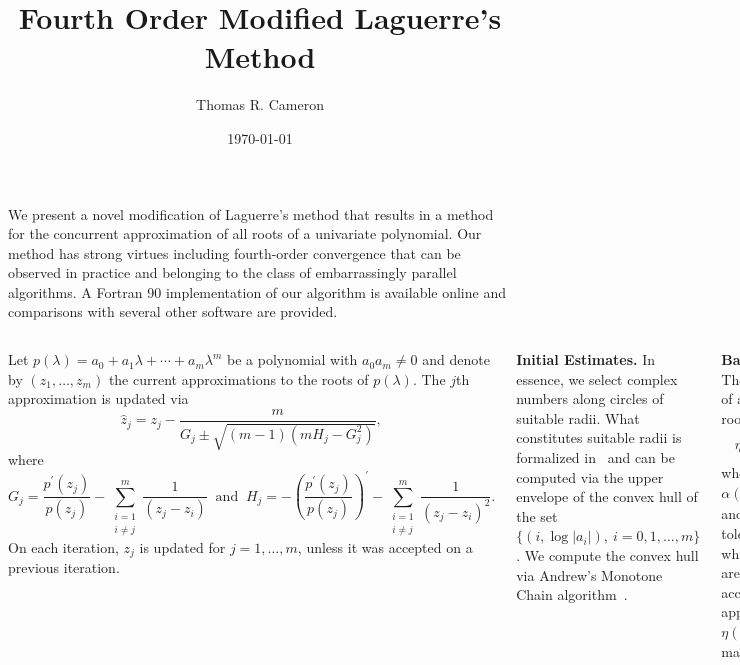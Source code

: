 \documentclass[20 pt, a0paper, portrait]{tikzposter}
\title{Fourth Order Modified Laguerre's Method}
\author{Thomas R. Cameron}
\date{\today}
\institute{Mathematics and Computer Science Department, Davidson College}
\begin{document}
 
\maketitle

{
We present a novel modification of Laguerre's method that results in a method for the concurrent approximation of all roots of a univariate polynomial. Our method has strong virtues including fourth-order convergence that can be observed in practice and belonging to the class of embarrassingly parallel algorithms. A Fortran 90 implementation of our algorithm is available online and comparisons with several other software are provided. 
}

\begin{columns}
	{
		Let $p(\lambda)=a_{0}+a_{1}\lambda+\cdots+a_{m}\lambda^{m}$ be a polynomial with $a_{0}a_{m}\neq 0$ and denote by $(z_{1},\ldots,z_{m})$ the current approximations to the roots of $p(\lambda)$. The $j$th approximation is updated via
		\begin{equation}
		\hat{z}_{j}=z_{j}-\frac{m}{G_{j}\pm\sqrt{(m-1)(mH_{j}-G_{j}^{2})}},
		\end{equation}
		where 
		\begin{equation}
		G_{j}=\frac{p^{'}(z_{j})}{p(z_{j})}-\sum_{\substack{i=1\\i\neq j}}^{m}\frac{1}{(z_{j}-z_{i})}~\text{ and }~H_{j}=-\left(\frac{p^{'}(z_{j})}{p(z_{j})}\right)^{'}-\sum_{\substack{i=1\\i\neq j}}^{m}\frac{1}{(z_{j}-z_{i})^{2}}.
		\end{equation}
		On each iteration, $z_{j}$ is updated for $j=1,\ldots,m$, unless it was accepted on a previous iteration.
		
	\textbf{Initial Estimates.} In essence, we select complex numbers along circles of suitable radii. What constitutes suitable radii is formalized in~\cite{Bini1996} and can be computed via the upper envelope of the convex hull of the set $\{(i,\log|a_{i}|),~i=0,1,\ldots,m\}$. We compute the convex hull via Andrew's Monotone Chain algorithm~\cite{Andrew1979}.
	
	\textbf{Backward Error.} The backward error of an approximate root $\xi$ is given by
	\begin{equation}
	\eta(\xi)=\frac{|p(\xi)|}{\alpha(\xi)},
	\end{equation}
	where $\alpha(\xi) = \sum_{i=0}^{m}|e_{i}||\xi|^{i}$ and $e_{i}$ represent tolerances against which perturbations are measured. We accept a root approximation $\xi$ if $\eta(\xi)<\mu$, where $\mu$ is machine precision. 
	
}
\end{columns}
\end{document}
